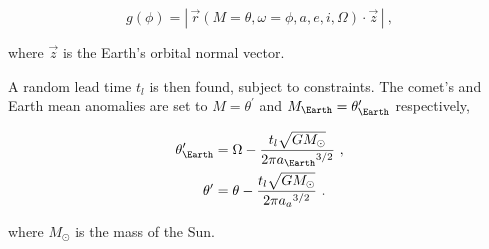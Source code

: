 \begin{equation}
    g(\phi) = | \, \vec{r}(M = \theta, \omega = \phi, a, e, i, \Omega) \cdot \vec{z} \, | ~,
\end{equation}

where $\vec{z}$ is the Earth's orbital normal vector.

A random lead time $t_l$ is then found, subject to constraints. The comet's and Earth mean anomalies are set to $M = \theta^{\prime}$ and $M_{\Earth} = \theta^{\prime}_{\Earth}$ respectively,

\begin{equation}
    \begin{split}
        \theta^{\prime}_{\Earth} &= \Omega - \dfrac{t_l \sqrt{GM_\odot}}{2\pi {a_{\Earth}}^{3/2}}~, \\
        \theta^{\prime} &= \theta - \dfrac{t_l \sqrt{GM_\odot}}{2\pi {a_{a}}^{3/2}}~.
    \end{split}
\end{equation}

where $M_\odot$ is the mass of the Sun.

\fi